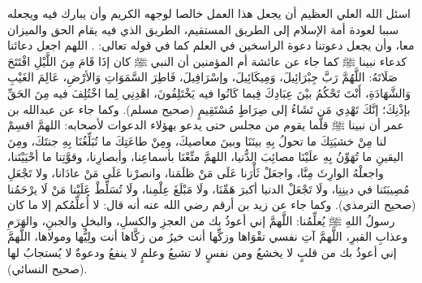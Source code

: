 اسئل الله العلي العظيم أن يجعل هذا العمل خالصا لوجهه الكريم وأن يبارك فيه ويجعله سببا لعودة أمة الإسلام إلى الطريق المستقيم، الطريق الذي فيه يقام الحق والميزان معا، وأن يجعل دعوتنا دعوة الراسخين في العلم كما في قوله تعالى:
\quranayah*[3][7][32]\quranayah*[3][8-9]{\footnotesize \surahname*[3]}. اللهم اجعل دعائنا كدعاء نبينا ﷺ كما جاء عن عائشة أم المؤمنين أن النبي ﷺ كان إذَا قَامَ مِنَ اللَّيْلِ افْتَتَحَ صَلَاتَهُ: اللَّهُمَّ رَبَّ جِبْرَائِيلَ، وَمِيكَائِيلَ، وإسْرَافِيلَ، فَاطِرَ السَّمَوَاتِ وَالأرْضِ، عَالِمَ الغَيْبِ وَالشَّهَادَةِ، أَنْتَ تَحْكُمُ بيْنَ عِبَادِكَ فِيما كَانُوا فيه يَخْتَلِفُونَ، اهْدِنِي لِما اخْتُلِفَ فيه مِنَ الحَقِّ بإذْنِكَ؛ إنَّكَ تَهْدِي مَن تَشَاءُ إلى صِرَاطٍ مُسْتَقِيمٍ {\footnotesize (صحيح مسلم)}. وكما جاء عن عبدالله بن عمر أن نبينا ﷺ قلَّما يقوم من مجلس حتى يدعو بهؤلاء الدعوات لأصحابه: اللهمَّ اقسِمْ لنا مِنْ خشيَتِكَ ما تحولُ بِهِ بينَنَا وبينَ معاصيكَ، ومِنْ طاعَتِكَ ما تُبَلِّغُنَا بِهِ جنتَكَ، ومِنَ اليقينِ ما تُهَوِّنُ بِهِ علَيْنَا مصائِبَ الدُّنيا، اللهمَّ متِّعْنَا بأسماعِنا، وأبصارِنا، وقوَّتِنا ما أحْيَيْتَنا، واجعلْهُ الوارِثَ مِنَّا، واجعَلْ ثَأْرَنا عَلَى مَنْ ظلَمَنا، وانصرْنا عَلَى مَنْ عادَانا، ولا تَجْعَلِ مُصِيبَتَنا في دينِنِا، ولَا تَجْعَلْ الدنيا أكبرَ هَمِّنَا، ولَا مَبْلَغَ عِلْمِنا، ولَا تُسَلِّطْ عَلَيْنا مَنْ لَا يرْحَمُنا {\footnotesize (صحيح الترمذي)}. وكما جاء عن زيد بن أرقم رضي الله عنه أنه قال: لا أُعلِّمُكم إلا ما كان رسولُ اللهِ ﷺ يُعلِّمُنا: اللَّهمَّ إني أعوذُ بك من العجزِ والكسلِ، والبخلِ والجبنِ، والهَرَمِ وعذابِ القبرِ، اللَّهمَّ آتِ نفسي تقْوَاها وزكِّها أنت خيرُ من زكَّاها أنت ولِيُّها ومولاها، اللَّهمَّ إني أعوذُ بك من قلبٍ لا يخشعُ ومن نفسٍ لا تشبعُ وعلمٍ لا ينفعُ ودعوةٌ لا يُستجابُ لها {\footnotesize (صحيح النسائي)}.

\vskip 0.5in

